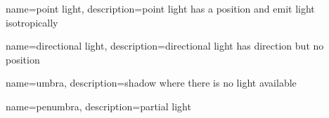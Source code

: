 {
  name=point light,
  description={point light has a position and emit light isotropically}
}

{
  name=directional light,
  description={directional light has direction but no position}
}

{
  name=umbra,
  description={shadow where there is no light available}
}

{
  name=penumbra,
  description={partial light}
}
